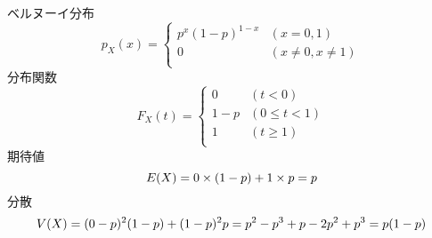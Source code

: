 \setlength{\parindent}{0pt}

ベルヌーイ分布
\begin{equation*}
  p_X(x)=
  \begin{cases}
    p^x(1-p)^{1-x} & (x=0,1)\\
    0 & (x\neq 0,x\neq 1) \\
  \end{cases}
\end{equation*}
分布関数
\begin{equation*}
  F_X(t)=
  \begin{cases}
    0 & (t < 0) \\
    1-p & (0 \le t < 1) \\
    1 & (t \ge 1) \\
  \end{cases}
\end{equation*}
期待値
\begin{equation*}
  E(X)=0\times (1-p)+1\times p=p \\
\end{equation*}
分散
\begin{equation*}
  V(X)=(0-p)^2(1-p)+(1-p)^2p=p^2-p^3+p-2p^2+p^3=p(1-p) \\
\end{equation*}

